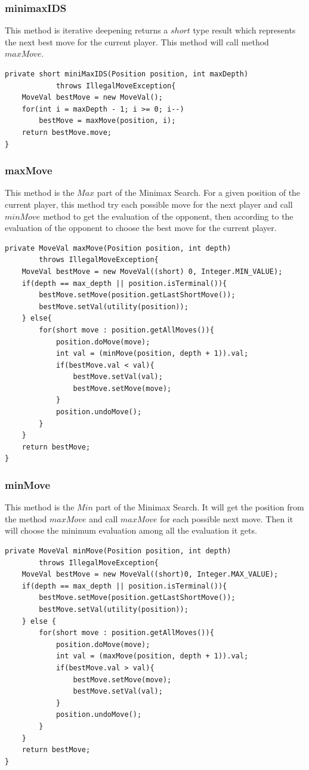 \documentclass{article}
\begin{document}
\subsubsection{minimaxIDS}
This method is iterative deepening returns a $short$ type result which represents the next best move for the current player. This method will call method $maxMove$.
\begin{lstlisting}
private short miniMaxIDS(Position position, int maxDepth) 
			throws IllegalMoveException{
	MoveVal bestMove = new MoveVal();
	for(int i = maxDepth - 1; i >= 0; i--)
		bestMove = maxMove(position, i);
	return bestMove.move;
}
\end{lstlisting}

\subsubsection{maxMove}
This method is the $Max$ part of the Minimax Search. For a given position of the current player, this method try each possible move for the next player and call $minMove$ method to get the evaluation of the opponent, then according to the evaluation of the opponent to choose the best move for the current player.
\begin{lstlisting}
private MoveVal maxMove(Position position, int depth) 
		throws IllegalMoveException{
	MoveVal bestMove = new MoveVal((short) 0, Integer.MIN_VALUE);
	if(depth == max_depth || position.isTerminal()){
		bestMove.setMove(position.getLastShortMove());
		bestMove.setVal(utility(position));
	} else{
		for(short move : position.getAllMoves()){
			position.doMove(move);
			int val = (minMove(position, depth + 1)).val;
			if(bestMove.val < val){
				bestMove.setVal(val);
				bestMove.setMove(move);
			}
			position.undoMove();
		}
	}
	return bestMove;	
}
\end{lstlisting}

\subsubsection{minMove}
This method is the $Min$ part of the Minimax Search. It will get the position from the method $maxMove$ and call $maxMove$ for each possible next move. Then it will choose the minimum evaluation among all the evaluation it gets.
\begin{lstlisting}
private MoveVal minMove(Position position, int depth) 
		throws IllegalMoveException{
	MoveVal bestMove = new MoveVal((short)0, Integer.MAX_VALUE);
	if(depth == max_depth || position.isTerminal()){
		bestMove.setMove(position.getLastShortMove());
		bestMove.setVal(utility(position));
	} else {
		for(short move : position.getAllMoves()){
			position.doMove(move);
			int val = (maxMove(position, depth + 1)).val;
			if(bestMove.val > val){
				bestMove.setMove(move);
				bestMove.setVal(val);
			}
			position.undoMove();
		}
	}
	return bestMove;
}
\end{lstlisting}
\end{document}
